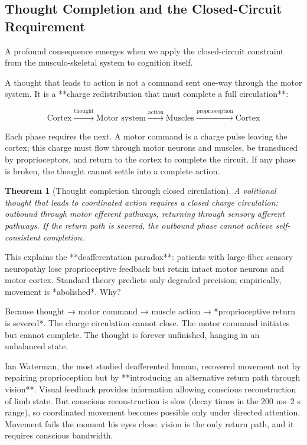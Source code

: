 \documentclass[twocolumn,10pt]{article}
\newtheorem{theorem}{Theorem}[section]
\theoremstyle{remark}
\begin{document}
\subsection{Thought Completion and the Closed-Circuit Requirement}

A profound consequence emerges when we apply the closed-circuit constraint from the musculo-skeletal system to cognition itself.

A thought that leads to action is not a command sent one-way through the motor system. It is a **charge redistribution that must complete a full circulation**:

\begin{equation}
\text{Cortex} \xrightarrow{\text{thought}} \text{Motor system} \xrightarrow{\text{action}} \text{Muscles} \xrightarrow{\text{proprioception}} \text{Cortex}
\end{equation}

Each phase requires the next. A motor command is a charge pulse leaving the cortex; this charge must flow through motor neurons and muscles, be transduced by proprioceptors, and return to the cortex to complete the circuit. If any phase is broken, the thought cannot settle into a complete action.

\begin{theorem}[Thought completion through closed circulation]
A volitional thought that leads to coordinated action requires a closed charge circulation: outbound through motor efferent pathways, returning through sensory afferent pathways. If the return path is severed, the outbound phase cannot achieve self-consistent completion.
\end{theorem}

This explains the **deafferentation paradox**: patients with large-fiber sensory neuropathy lose proprioceptive feedback but retain intact motor neurons and motor cortex. Standard theory predicts only degraded precision; empirically, movement is *abolished*. Why?

Because thought → motor command → muscle action → *proprioceptive return is severed*. The charge circulation cannot close. The motor command initiates but cannot complete. The thought is forever unfinished, hanging in an unbalanced state.

Ian Waterman, the most studied deafferented human, recovered movement not by repairing proprioception but by **introducing an alternative return path through vision**. Visual feedback provides information allowing conscious reconstruction of limb state. But conscious reconstruction is slow (decay times in the 200 ms--2 s range), so coordinated movement becomes possible only under directed attention. Movement fails the moment his eyes close: vision is the only return path, and it requires conscious bandwidth.
\end{document}
